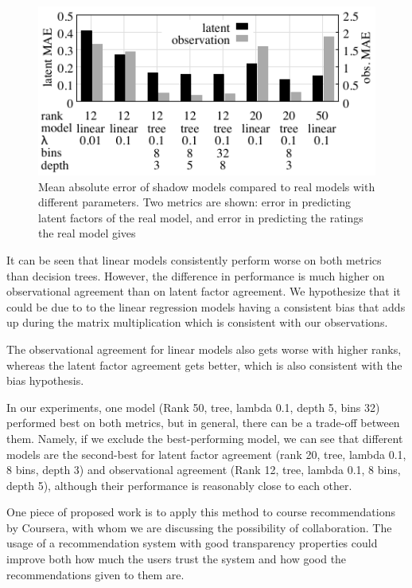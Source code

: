 \begin{figure}
\includegraphics[width=\textwidth]{figures/shadow_parameters_accuracy.pdf}
\caption{\label{table:results:parameters} Mean absolute error of shadow
	models compared to real models with different parameters. Two metrics
	are shown: error in predicting latent factors of the real model, and error
	in predicting the ratings the real model gives}
\end{figure}

It can be seen that linear models consistently perform worse on both
metrics than decision trees. 
However, the difference in performance is much higher on observational
agreement than on latent factor agreement. 
We hypothesize that it could be due to to the linear regression models
having a consistent bias that adds up during the matrix multiplication
which is consistent with our
observations.

The observational agreement for linear models also gets worse with higher ranks,
whereas the latent factor agreement gets better, which is also consistent with the
bias hypothesis.

In our experiments, one model (Rank 50, tree, lambda 0.1, depth 5, bins 32) performed
best on both metrics, but in general, there can be a trade-off between them. Namely,
if we exclude the best-performing model, we can see that different models are the
second-best for latent factor agreement (rank 20, tree, lambda 0.1, 8 bins, depth 3)
and observational agreement (Rank 12, tree, lambda 0.1, 8 bins, depth 5),
although their performance is reasonably close to each other.











One piece of proposed work is to apply this method to course recommendations by
Coursera, with whom we are discussing the possibility of collaboration. The
usage of a recommendation system with good transparency properties could improve
both how much the users trust the system and how good the recommendations
given to them are.
